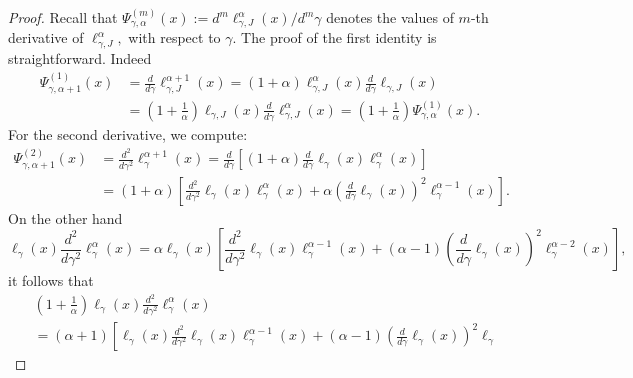 \documentclass[12pt,reqno,openbib,runningheads,a4paper,portrait]{amsart}%
\begin{document}
\begin{proof}
Recall that $\Psi_{\gamma,\alpha}^{\left(  m\right)  }\left(  x\right)
:=d^{m}\ell_{\gamma,J}^{\alpha}\left(  x\right)  /d^{m}\gamma$ denotes the
values of $m$-th derivative of $\ell_{\gamma,J}^{\alpha},$ with respect to
$\gamma.$ The proof of the first identity is straightforward. Indeed%
\begin{align*}
\Psi_{\gamma,\alpha+1}^{\left(  1\right)  }\left(  x\right)   &  =\frac
{d}{d\gamma}\ell_{\gamma,J}^{\alpha+1}\left(  x\right)  =\left(
1+\alpha\right)  \ell_{\gamma,J}^{\alpha}\left(  x\right)  \frac{d}{d\gamma
}\ell_{\gamma,J}\left(  x\right)  \\
&  =\left(  1+\frac{1}{\alpha}\right)  \ell_{\gamma,J}\left(  x\right)
\frac{d}{d\gamma}\ell_{\gamma,J}^{\alpha}\left(  x\right)  =\left(  1+\frac
{1}{\alpha}\right)  \Psi_{\gamma,\alpha}^{\left(  1\right)  }\left(  x\right)
.
\end{align*}
For the second derivative, we compute:%
\begin{align*}
\Psi_{\gamma,\alpha+1}^{\left(  2\right)  }\left(  x\right)   &  =\frac{d^{2}%
}{d\gamma^{2}}\ell_{\gamma}^{\alpha+1}\left(  x\right)  =\frac{d}{d\gamma
}\left[  \left(  1+\alpha\right)  \frac{d}{d\gamma}\ell_{\gamma}\left(
x\right)  \ell_{\gamma}^{\alpha}\left(  x\right)  \right]  \\
&  =\left(  1+\alpha\right)  \left[  \frac{d^{2}}{d\gamma^{2}}\ell_{\gamma
}\left(  x\right)  \ell_{\gamma}^{\alpha}\left(  x\right)  +\alpha\left(
\frac{d}{d\gamma}\ell_{\gamma}\left(  x\right)  \right)  ^{2}\ell_{\gamma
}^{\alpha-1}\left(  x\right)  \right]  .
\end{align*}
On the other hand%
\[
\ell_{\gamma}\left(  x\right)  \frac{d^{2}}{d\gamma^{2}}\ell_{\gamma}^{\alpha
}\left(  x\right)  =\alpha\ell_{\gamma}\left(  x\right)  \left[  \frac{d^{2}%
}{d\gamma^{2}}\ell_{\gamma}\left(  x\right)  \ell_{\gamma}^{\alpha-1}\left(
x\right)  +\left(  \alpha-1\right)  \left(  \frac{d}{d\gamma}\ell_{\gamma
}\left(  x\right)  \right)  ^{2}\ell_{\gamma}^{\alpha-2}\left(  x\right)
\right]  ,
\]
it follows that%
\begin{align*}
&  \left(  1+\frac{1}{\alpha}\right)  \ell_{\gamma}\left(  x\right)
\frac{d^{2}}{d\gamma^{2}}\ell_{\gamma}^{\alpha}\left(  x\right)  \\
&  =\left(  \alpha+1\right)  \left[  \ell_{\gamma}\left(  x\right)
\frac{d^{2}}{d\gamma^{2}}\ell_{\gamma}\left(  x\right)  \ell_{\gamma}%
^{\alpha-1}\left(  x\right)  +\left(  \alpha-1\right)  \left(  \frac
{d}{d\gamma}\ell_{\gamma}\left(  x\right)  \right)  ^{2}\ell_{\gamma}%

\end{align*}
\end{proof}
\end{document}
